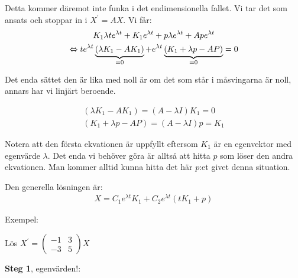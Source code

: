 \noindent Detta kommer däremot inte funka i det endimensionella fallet. Vi tar det som ansats och stoppar in i $X^{\prime} = AX$. Vi får:
\begin{equation*}
  \begin{gathered}
    K_1\lambda te^{\lambda t}+K_1e^{\lambda t}+p\lambda e^{\lambda t}+Ape^{\lambda t}\\
    \Leftrightarrow te^{\lambda t}\underbrace{\left(\lambda K_1-AK_1\right)}_{\text{=0}}+e^{\lambda t}\underbrace{\left(K_1+\lambda p-AP\right)}_{\text{=0}}=0
  \end{gathered}
\end{equation*}\par
\noindent Det enda sättet den är lika med noll är om det som står i måsvingarna är noll, annars har vi linjärt beroende.
\par\bigskip

\begin{equation*}
  \begin{gathered}
    \left(\lambda K_1-AK_1\right) = (A-\lambda I)K_1 = 0\\
    \left(K_1+\lambda p-AP\right) = (A-\lambda I)p=K_1
  \end{gathered}
\end{equation*}\par
\noindent Notera att den första ekvationen är uppfyllt eftersom $K_1$ är en egenvektor med egenvärde $\lambda$. Det enda vi behöver göra är alltså att hitta $p$ som löser den andra ekvationen. Man kommer alltid kunna hitta det här $p$:et givet denna situation.\par
\noindent Den generella lösningen är:
\begin{equation*}
  \begin{gathered}
    X = C_1e^{\lambda t}K_1 + C_2e^{\lambda t}(tK_1+p)
  \end{gathered}
\end{equation*}
\par\bigskip
\noindent Exempel:\par
\noindent Lös $X^{\prime} = \begin{pmatrix}-1&3\\-3&5\end{pmatrix}X$
\par\bigskip
\noindent\textbf{Steg 1}, egenvärden!:

